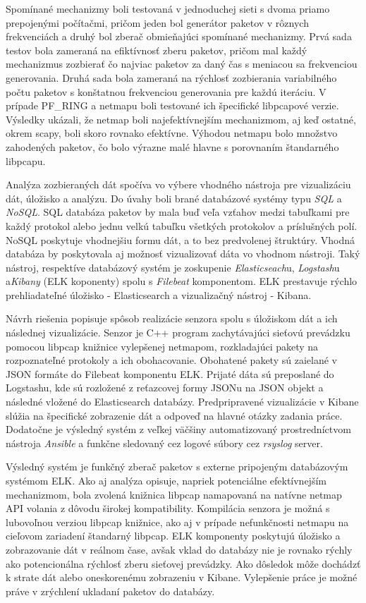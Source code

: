 \documentclass[12pt,a4paper,twoside]{book}
\begin{document}
    Spomínané mechanizmy boli testovaná v jednoduchej sieti s dvoma priamo prepojenými počítačmi, pričom jeden bol generátor paketov v rôznych frekvenciách a druhý bol zberač obmieňajúci spomínané mechanizmy. Prvá sada testov bola zameraná na efiktívnosť zberu paketov, pričom mal každý mechanizmus zozbierať čo najviac paketov za daný čas s meniacou sa frekvenciou generovania. Druhá sada bola zameraná na rýchlosť zozbierania variabilného počtu paketov s konštatnou frekvenciou generovania pre každú i\-te\-rá\-ciu. V prípade PF\_RING a netmapu boli testované ich špecifické libpcapové verzie. Výsledky ukázali, že netmap boli najefektívnejším mechanizmom, aj keď ostatné, okrem scapy, boli skoro rovnako efektívne. Výhodou netmapu bolo množstvo zahodených paketov, čo bolo výrazne malé hlavne s porovnaním štandarného libpcapu.\par
    Analýza zozbieraných dát spočíva vo výbere vhodného nástroja pre vi\-zua\-li\-zá\-ciu dát, úložisko a analýzu. Do úvahy boli brané databázové systémy typu \emph{SQL} a \emph{NoSQL}. SQL databáza paketov by mala buď veľa vzťahov medzi tabuľkami pre každý protokol alebo jednu velkú tabuľku všetkých protokolov a príslušných polí. NoSQL poskytuje vhodnejšiu formu dát, a to bez predvolenej štruktúry. Vhodná databáza by poskytovala aj možnosť vizualizovať dáta vo vhodnom nástroji. Taký nástroj, respektíve databázový systém je zoskupenie \emph{Elasticseach}u, \emph{Logstash}u a\emph{Kibany} (ELK koponenty) spolu s \emph{Filebeat} komponentom. ELK prestavuje rýchlo prehliadateľné úložisko - Elasticsearch a vizualizačný nástroj - Kibana.\par
    Návrh riešenia popisuje spôsob realizácie senzora spolu s úložiskom dát a ich následnej vizualizácie. Senzor je C++ program zachytávajúci sieťovú prevádzku pomocou libpcap knižnice vylepšenej netmapom, rozkladajúci pakety na rozpoznateľné protokoly a ich obohacovanie. Obohatené pakety sú zaielané v JSON formáte do Filebeat komponentu ELK. Prijaté dáta sú preposlané do Logstashu, kde sú rozložené z reťazcovej formy JSONu na JSON objekt a následné vložené do Elasticsearch databázy. Predpripravené vizualizácie v Kibane slúžia na špecifické zobrazenie dát a odpoveď na hlavné otázky zadania práce. Dodatočne je výsledný systém z veľkej väčšiny automatizovaný prostredníctvom nástroja \emph{Ansible} a funkčne sledovaný cez logové súbory cez \emph{rsyslog} server.\par
    Výsledný systém je funkčný zberač paketov s externe pripojeným da\-ta\-bá\-zo\-vým systémom ELK. Ako aj analýza opisuje, napriek potenciálne efektívnejším mechanizmom, bola zvolená knižnica libpcap namapovaná na natívne netmap API volania z dôvodu širokej kompatibility. Kompilácia senzora je možná s lubovoľnou verziou libpcap knižnice, ako aj v prípade nefunkčnosti netmapu na cieľovom zariadení štandarný libpcap. ELK komponenty poskytujú úložisko a zobrazovanie dát v reálnom čase, avšak vklad do databázy nie je rovnako rýchly ako potencionálna rýchlosť zberu sieťovej prevádzky. Ako dôsledok môže dochádzť k strate dát alebo oneskorenému zobrazeniu v Kibane. Vy\-lep\-še\-nie práce je možné práve v zrýchlení ukladaní paketov do databázy.\par
\end{document}
